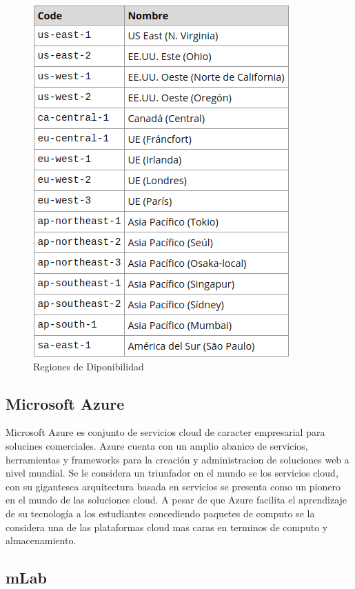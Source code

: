 \documentclass[a4paper,11pt]{book}
\begin{document}
\begin{figure}[H]  
\centering 
\includegraphics[scale=0.35]{imagenes/zonas.png}
\caption{ Regiones de Diponibilidad }  
\end{figure} 

\subsection{Microsoft Azure}

Microsoft Azure\cite{azure} es conjunto de servicios cloud de caracter empresarial para solucines comerciales. Azure cuenta con un amplio abanico de servicios, herramientas y frameworks para la creación y administracion de soluciones web a nivel mundial. Se le considera un triunfador en el mundo se los servicios cloud, con su gigantesca arquitectura basada en servicios se presenta como un pionero en el mundo de las soluciones cloud. A pesar de que Azure facilita el aprendizaje de su tecnología a los estudiantes concediendo paquetes de computo se la considera una de las plataformas cloud mas caras en terminos de computo y almacenamiento. 

\subsection{mLab}
\end{document}
